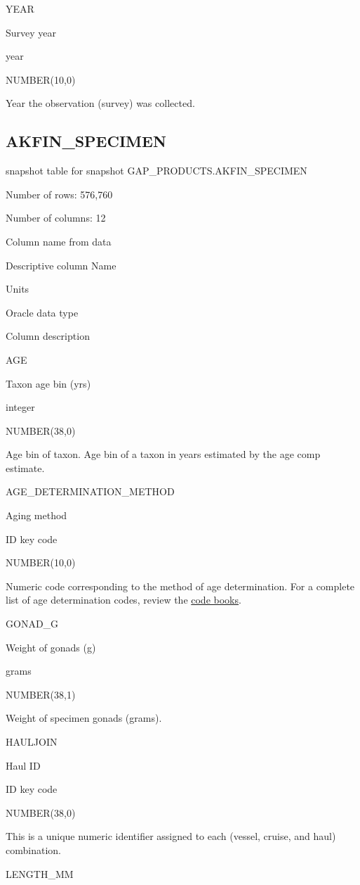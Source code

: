\documentclass[
  letterpaper,
  oneside,
  open=any]{scrbook}
\begin{document}
YEAR

Survey year

year

NUMBER(10,0)

Year the observation (survey) was collected.

\hypertarget{akfin_specimen}{%
\subsection{AKFIN\_SPECIMEN}\label{akfin_specimen}}

snapshot table for snapshot GAP\_PRODUCTS.AKFIN\_SPECIMEN

Number of rows: 576,760

Number of columns: 12

Column name from data

Descriptive column Name

Units

Oracle data type

Column description

AGE

Taxon age bin (yrs)

integer

NUMBER(38,0)

Age bin of taxon. Age bin of a taxon in years estimated by the age comp
estimate.

AGE\_DETERMINATION\_METHOD

Aging method

ID key code

NUMBER(10,0)

Numeric code corresponding to the method of age determination. For a
complete list of age determination codes, review the
\href{https://www.fisheries.noaa.gov/resource/document/groundfish-survey-species-code-manual-and-data-codes-manual}{code
books}.

GONAD\_G

Weight of gonads (g)

grams

NUMBER(38,1)

Weight of specimen gonads (grams).

HAULJOIN

Haul ID

ID key code

NUMBER(38,0)

This is a unique numeric identifier assigned to each (vessel, cruise,
and haul) combination.

LENGTH\_MM
\end{document}

